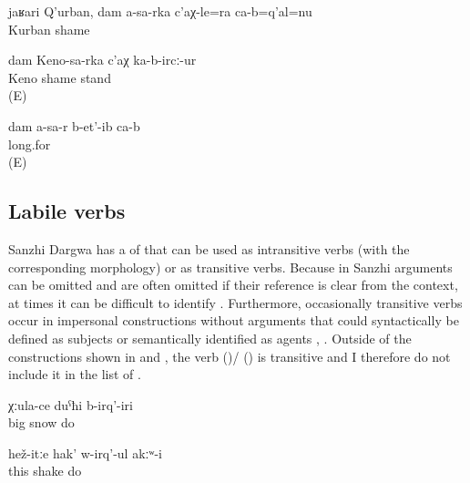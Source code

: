 	\begin{exe}	
		\ex	\label{ex:Hey, Kurban, I am ashamed in front of you}
	\gll	jaʁari	Q'urban,	dam	a-sa-rka	c'aχ-le=ra	ca-b=q'al=nu\\
			Kurban			shame	\\
	\glt	{}

	\ex	\label{ex:I got embarrassed in front of Ali}
	\gll	dam	Keno-sa-rka	c'aχ	ka-b-ircː-ur\\
			Keno	shame	stand\\
	\glt	{} (E)
	
	\ex	\label{ex:I miss youValency}
	\gll	dam	a-sa-r	b-et'-ib ca-b\\
				long.for \\
	\glt	{} (E)
\end{exe}




\subsection{Labile verbs}
\label{sec:Labile verbs}

Sanzhi Dargwa has a  of  that can be used as intransitive verbs (with the corresponding morphology) or as transitive verbs. Because in Sanzhi arguments can be omitted and are often omitted if their reference is clear from the context, at times it can be difficult to identify . Furthermore, occasionally transitive verbs occur in impersonal constructions without arguments that could syntactically be defined as subjects or semantically identified as agents , . Outside of the constructions shown in  and , the verb  ()\slash{} () is transitive and I therefore do not include it in the list of .

\begin{exe}
	\ex	\label{ex:It used to snow a lotA}
	\gll	χːula-ce	duˁħi	b-irq'-iri\\
		big	snow	do\\
	\glt	{}

	\ex	\label{ex:He was not shaking like this (i.e. not able to move)}
	\gll	hež-itːe	hak'	w-irq'-ul	akːʷ-i\\
		this	shake	do	\\
	\glt	{}
\end{exe}

